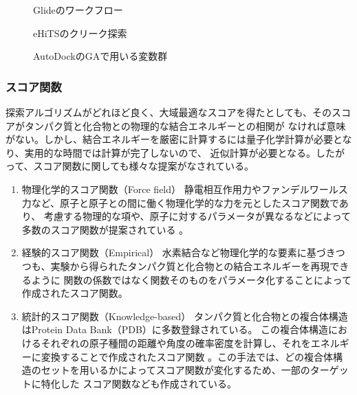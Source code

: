 \begin{figure}[htb]
 \begin{center}
  \caption{Glideのワークフロー\cite{Friesner2004}}
  \label{fig:glide_flowchart}
 \end{center}
\end{figure}
\begin{figure}[htb]
 \begin{center}
  \caption{eHiTSのクリーク探索}
  \label{fig:eHiTS_clique}
 \end{center}
\end{figure}
\begin{figure}[htb]
 \begin{center}
  \caption{AutoDockのGAで用いる変数群}
  \label{fig:AutoDock_gene}
 \end{center}
\end{figure}


\subsubsection{スコア関数}
探索アルゴリズムがどれほど良く、大域最適なスコアを得たとしても、そのスコアがタンパク質と化合物との物理的な結合エネルギーとの相関が
なければ意味がない。しかし、結合エネルギーを厳密に計算するには量子化学計算が必要となり、実用的な時間では計算が完了しないので、
近似計算が必要となる。したがって、スコア関数に関しても様々な提案がなされている。
\begin{enumerate}
\item 物理化学的スコア関数（Force field）
	静電相互作用力やファンデルワールス力など、原子と原子との間に働く物理化学的な力を元としたスコア関数であり、
	考慮する物理的な項や、原子に対するパラメータが異なるなどによって多数のスコア関数が提案されている
	\cite{Morris1998, Ewing2001, Jones1997}。
\item 経験的スコア関数（Empirical）
	水素結合など物理化学的な要素に基づきつつも、実験から得られたタンパク質と化合物との結合エネルギーを再現できるように
	関数の係数ではなく関数そのものをパラメータ化することによって作成されたスコア関数\cite{Wang2002, Gehlhaar1995, Eldridge1997}。
\item 統計的スコア関数（Knowledge-based）
	タンパク質と化合物との複合体構造はProtein Data Bank（PDB）\cite{Berman2000}に多数登録されている。
	この複合体構造におけるそれぞれの原子種間の距離や角度の確率密度を計算し、それをエネルギーに変換することで作成されたスコア関数
	\cite{Muegge2006, Xue2010, Gohlke2000, Huang2010}。この手法では、どの複合体構造のセットを用いるかによってスコア関数が変化するため、一部のターゲットに特化した
	スコア関数なども作成されている\cite{Seifert2009}。
\end{enumerate}

